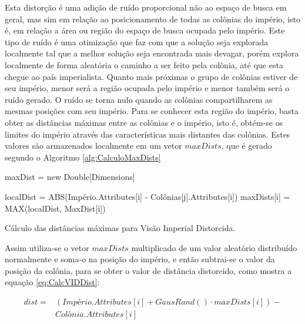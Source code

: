   	Esta distorção é uma adição de ruído proporcional não ao espaço de busca em geral, mas sim em relação ao posicionamento de todas as colônias do império, isto é, em relação a área ou região do espaço de busca ocupada pelo império. Este tipo de ruído é uma otimização que faz com que a solução seja explorada localmente tal que a melhor solução seja encontrada mais devagar, porém explora localmente de forma aleatória o caminho a ser feito pela colônia, até que esta chegue ao país imperialista. Quanto mais próximas o grupo de colônias estiver de seu império, menor será a região ocupada pelo império e menor também será o ruído gerado. O ruído se torna nulo quando as colônias compartilharem as mesmas posições com seu império. Para se conhecer esta região do império, basta obter as distâncias máximas entre as colônias e o império, isto é, obtém-se os limites do império através das características mais distantes das colônias. Estes valores são armazenados localmente em um vetor \(maxDists\), que é gerado segundo o Algoritmo \ref{alg:CalculoMaxDists}
    
\vspace{10px}
\begin{algorithm}[h]
\SetAlgoLined
{}
maxDist = new Double[Dimensions]\;

{
    {
    	localDist = ABS(Império.Attributes[i] - Colônias[j].Attributes[i])\;
        maxDists[i] = MAX(localDist, MaxDist[i])\;
    }
}
\caption{ Cálculo das distâncias máximas para Visão Imperial Distorcida.}
\label{alg:CalculoMaxDists}
\end{algorithm}

Assim utiliza-se o vetor \(maxDists\) multiplicado de um valor aleatório distribuído normalmente e soma-o na posição do império, e então subtrai-se o valor da posição da colônia, para se obter o valor de distância distorcido, como mostra a equação \ref{eq:CalcVIDDist}:

\begin{equation}
\label{eq:CalcVIDDist}
\begin{split}
dist = 
&(Império.Attributes[i] + GausRand() \cdot maxDists[i]) - \\ &Colônia.Attributes[i]
\end{split}
\end{equation}

